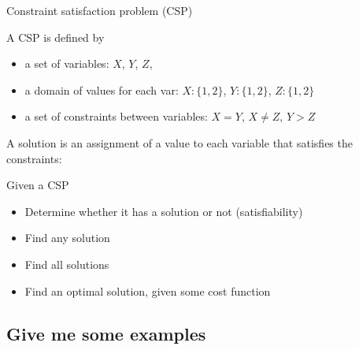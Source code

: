 \begin{frame}{Constraint satisfaction problem (CSP)}
 
 \begin{block}{A CSP is defined by}
\begin{itemize}
 \item a set of variables: $X$, $Y$, $Z$,
\item a domain of values for each var: $X:\{1,2\}$, $Y:\{1,2\}$, $Z:\{1,2\}$
\item a set of constraints between variables: $X = Y$, $X \neq Z$, $Y > Z$
\end{itemize}
\end{block}

\begin{block}{A solution is an assignment of a value to each variable that}
satisfies the constraints: 
\end{block}

\begin{block}{Given a CSP}
\begin{itemize}
\item Determine whether it has a solution or not (satisfiability)
\item Find any solution
\item Find all solutions
\item Find an optimal solution, given some cost function
\end{itemize}
\end{block} 
\end{frame}


\subsection{Give me some examples}

\begin{comment}
\begin{frame}{}
\begin{itemize}
 \item Puzzle
\item Map coloring
\item N-queen problem
\item Sudoku
\item Cryptarithmetic problem
\end{itemize}
\pgfimage[width=5cm]{fig/puzzle} 
\pgfimage[width=5cm]{fig/sudoku}

\end{frame}
\end{comment}

